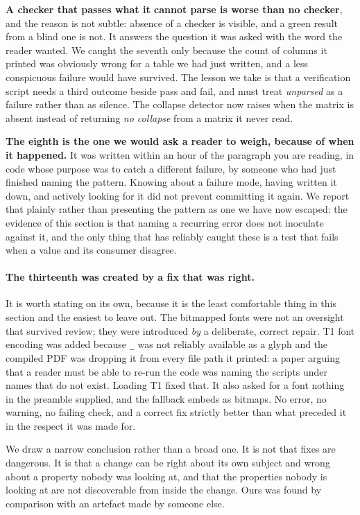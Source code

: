 \textbf{A checker that passes what it cannot parse is worse than no checker},
and the reason is not subtle: absence of a checker is visible, and a green result
from a blind one is not. It answers the question it was asked with the word the
reader wanted. We caught the seventh only because the count of columns it printed
was obviously wrong for a table we had just written, and a less conspicuous
failure would have survived. The lesson we take is that a verification script
needs a third outcome beside pass and fail, and must treat \emph{unparsed} as a
failure rather than as silence. The collapse detector now raises when the matrix
is absent instead of returning \emph{no collapse} from a matrix it never read.

\textbf{The eighth is the one we would ask a reader to weigh, because of when it
happened.} It was written within an hour of the paragraph you are reading, in
code whose purpose was to catch a different failure, by someone who had just
finished naming the pattern. Knowing about a failure mode, having written it
down, and actively looking for it did not prevent committing it again. We report
that plainly rather than presenting the pattern as one we have now escaped: the
evidence of this section is that naming a recurring error does not inoculate
against it, and the only thing that has reliably caught these is a test that
fails when a value and its consumer disagree.

\paragraph{The thirteenth was created by a fix that was right.} It is worth
stating on its own, because it is the least comfortable thing in this section
and the easiest to leave out. The bitmapped fonts were not an oversight that
survived review; they were introduced \emph{by} a deliberate, correct repair.
T1 font encoding was added because \texttt{\_} was not reliably available as a
glyph and the compiled PDF was dropping it from every file path it printed: a
paper arguing that a reader must be able to re-run the code was naming the
scripts under names that do not exist. Loading T1 fixed that. It also asked for
a font nothing in the preamble supplied, and the fallback embeds as bitmaps.
No error, no warning, no failing check, and a correct fix strictly better than
what preceded it in the respect it was made for.

We draw a narrow conclusion rather than a broad one. It is not that fixes are
dangerous. It is that a change can be right about its own subject and wrong
about a property nobody was looking at, and that the properties nobody is
looking at are not discoverable from inside the change. Ours was found by
comparison with an artefact made by someone else.

